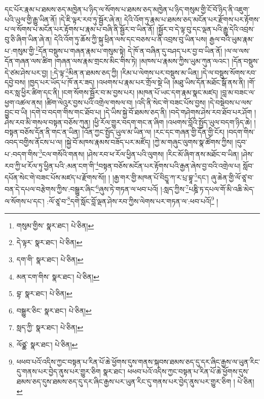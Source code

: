དང་པོར་རྣམ་པ་ཐམས་ཅད་མཁྱེན་པ་ཉིད་ལ་སོགས་པ་ཐམས་ཅད་མཁྱེན་པ་ཉིད་གསུམ་གྱི་ངོ་བོ་ཉིད་ནི་འཇུག་པའི་ཡུལ་གྱི་རྒྱུ་ཡིན་ནོ། །དེ་ཇི་ལྟར་རབ་ཏུ་སྦྱོར་ཞེ་ན། དེའི་འོག་ཏུ་རྣམ་པ་ཐམས་ཅད་མངོན་པར་རྫོགས་པར་རྟོགས་པ་ལ་སོགས་པ་མངོན་པར་རྟོགས་པ་རྣམ་པ་བཞི་ནི་སྦྱོར་བ་ཡིན་ནོ། །སྦྱོར་བ་དེ་ལྟ་བུ་དང་ལྡན་པའི་རྒྱུ་དེའི་འབྲས་བུ་ཅི་ཞིག་ཡིན་ཞེ་ན། དེའི་འོག་ཏུ་ཆོས་ཀྱི་སྐུ་ཕྲིན་ལས་དང་བཅས་པ་ནི་འབྲས་བུ་ཡིན་པས། རྒྱལ་བའི་ཡུམ་རྣམ་པ་:གསུམ་གྱི་\footnote{གསུམ་གྱིས་  སྣར་ཐང་།  པེ་ཅིན། }དོན་བསྡུས་པ་གཞན་རྣམ་པ་གསུམ་སྟེ། དེ་ཁོ་ན་བཞིན་དུ་བཤད་པར་བྱ་བ་ཡིན་ནོ། །ལ་ལ་ལས་དོན་གཞན་ལས་ཚིག །གཞན་ལས་རྣམ་གྲངས་མིང་གིས་ཏེ། །མཁས་པ་རྣམས་ཀྱིས་ཡུམ་ཀུན་ལའང་། །དོན་བསྡུས་དེ་ཙམ་ཤེས་པར་བྱ། །:དེ་ལྟ་\footnote{དེ་ལྟར་  སྣར་ཐང་།  པེ་ཅིན། }མིན་ན་ཐམས་ཅད་ཀྱི། །རིམ་པ་ལེགས་པར་བསྡུས་མ་ཡིན། །དེ་ལ་བསྡུས་སོགས་རབ་དབྱེ་བས། །ཁྱད་པར་ཡོད་པ་ཁོ་ནར་ཟད། །འཕགས་པ་རྣམ་པར་གྲོལ་སྡེ་ཡི། །མཐུ་ཡིས་དོན་མཐོང་སྒོ་ནས་ནི། །གོ་བར་སླ་ཕྱིར་ཚིག་དང་ནི། །ངག་སོགས་སྦྱོར་བ་མ་བྱས་པར། །མཁན་པོ་ཡང་དག་རྣམ་སྣང་མཛད། །བླ་མ་བཟང་ལ་ཕྱག་འཚལ་ནས། །ཚིག་ལེའུར་བྱས་པའི་འགྲེལ་གསལ་བ། །འདི་ནི་སེང་གེ་བཟང་པོས་བྱས། །དེ་བསྡེབས་པ་ལས་བྱུང་བ་ཡི། །དགེ་བ་བདག་གིས་གང་ཐོབ་པ། །དེ་ཡིས་སྐྱེ་བོ་ཐམས་ཅད་ནི། །བདེ་གཤེགས་ཤེས་རབ་ཐོབ་པར་ཤོག །ཤེས་རབ་མི་གསལ་བསྟན་བཅོས་ཀུན། །ཕྱི་རོལ་གྱུར་བདག་གང་ན་ཞིག །འཕགས་བློའི་སྤྱོད་ཡུལ་བདག་ཉིད་ཆེ། །བསྟན་བཅོས་དོན་ནི་གང་ན་ཡིན། །འོན་ཀྱང་སྤྱོད་ཡུལ་མ་ཡིན་ལ། །རང་དང་གཞན་གྱི་དོན་གྱི་ངོར། །བདག་གིས་འབད་བགྱིས་ནོངས་པ་ལ། །སྐྱེ་བོ་མཁས་རྣམས་བཟོད་པར་མཛོད། །ཀྱེ་མ་གཞུང་ལུགས་སྣ་ཚོགས་ཀྱིས། །དུབ་པ་:བདག་གིས་\footnote{དག་གི་  སྣར་ཐང་།  པེ་ཅིན། }ངལ་གསོའི་གནས། །ཤེས་རབ་ཕ་རོལ་ཕྱིན་པའི་ལུགས། །རིང་མོ་ཞིག་ནས་མཐོང་བ་ཡིན། །ཤེས་རབ་ཀྱི་ཕ་རོལ་ཏུ་ཕྱིན་པའི་:མན་ངག་གི་\footnote{མན་ངག་གིས་  སྣར་ཐང་།  པེ་ཅིན། }བསྟན་བཅོས་མངོན་པར་རྟོགས་པའི་རྒྱན་ཞེས་བྱ་བའི་འགྲེལ་པ། སློབ་དཔོན་སེང་གེ་བཟང་པོས་མཛད་པ་རྫོགས་སོ།། །
།རྒྱ་གར་གྱི་མཁན་པོ་བིདྱཱ་ཀ་ར་པྲ་བྷཱ་\footnote{བྷ་  སྣར་ཐང་།  པེ་ཅིན། }དང་། ཞུ་ཆེན་གྱི་ལོ་ཙཱ་བ་བན་དེ་དཔལ་བརྩེགས་ཀྱིས་:བསྒྱུར་ཞིང་\footnote{བསྒྱུར་ཅིང་  སྣར་ཐང་།  པེ་ཅིན། }ཞུས་ཏེ་གཏན་ལ་ཕབ་པའོ། །:སླད་ཀྱིས་\footnote{སླད་ཀྱི་  སྣར་ཐང་།  པེ་ཅིན། }པཎྜི་ཏ་དཔལ་གོ་མི་འཆི་མེད་ལ་སོགས་པ་དང་། :ལོ་ཙཱ་བ་\footnote{ལོཙྪ་  སྣར་ཐང་།  པེ་ཅིན། }དགེ་སློང་བློ་ལྡན་ཤེས་རབ་ཀྱིས་ལེགས་པར་གཏན་ལ་:ཕབ་པའོ།\footnote{ཕཕབ་པའོ་འདིས་ཀྱང་བསྟན་པ་རིན་པོ་ཆེ་ཕྱོགས་དུས་གནས་སྐབས་ཐམས་ཅད་དུ་དར་ཞིང་རྒྱས་ལ་ཡུན་རིང་དུ་གནས་པར་བྱེད་ནུས་པར་གྱུར་ཅིག   སྣར་ཐང་། ཕཕབ་པའོ་འདིས་ཀྱང་བསྟན་པ་རིན་པོ་ཆེ་ཕྱོགས་དུས་ཐམས་ཅད་དུས་ཐམས་ཅད་དུ་དར་ཞིང་རྒྱས་པར་ཡུན་རིང་དུ་གནས་པར་བྱེད་ནུས་པར་གྱུར་ཅིག །  པེ་ཅིན། } །